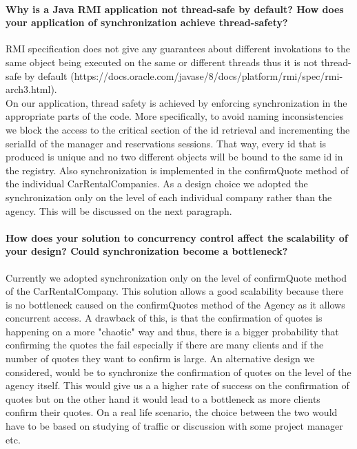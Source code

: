 \documentclass{ds-report}
\begin{document}
		
	\paragraph{Why is a Java RMI application not thread-safe by default? How does your application of synchronization achieve thread-safety?\\}
    RMI specification does not give any guarantees about different invokations to the same object being executed on the same or different threads
    thus it is not thread-safe by default (https://docs.oracle.com/javase/8/docs/platform/rmi/spec/rmi-arch3.html). \\
    On our application, thread safety is achieved by enforcing synchronization in the appropriate parts of the code. More specifically, to avoid
    naming inconsistencies we block the access to the critical section of the id retrieval and incrementing the serialId of the manager and reservations sessions.
    That way, every id that is produced is unique and no two different objects will be bound to the same id in the registry.
    Also synchronization is implemented in the confirmQuote method of the individual CarRentalCompanies. As a design choice we adopted
    the synchronization only on the level of each individual company rather than the agency. This will be discussed on the next paragraph.

	\paragraph{How does your solution to concurrency control affect the scalability of your design? Could synchronization become a bottleneck?\\}
    Currently we adopted synchronization only on the level of confirmQuote method of the CarRentalCompany. This solution allows a
    good scalability because there is no bottleneck caused on the confirmQuotes method of the Agency as it allows concurrent access.
    A drawback of this, is that the confirmation of quotes is happening on a more "chaotic" way and thus, there is a bigger probability
    that confirming the quotes the fail especially if there are many clients and if the number of quotes they want to confirm is large.
    An alternative design we considered, would be to synchronize the confirmation of quotes on the level of the agency itself. This
    would give us a a higher rate of success on the confirmation of quotes but on the other hand it would lead to a bottleneck as
    more clients confirm their quotes.
    On a real life scenario, the choice between the two would have to be based on studying of traffic or discussion with some project
    manager etc.
    
\end{document}
